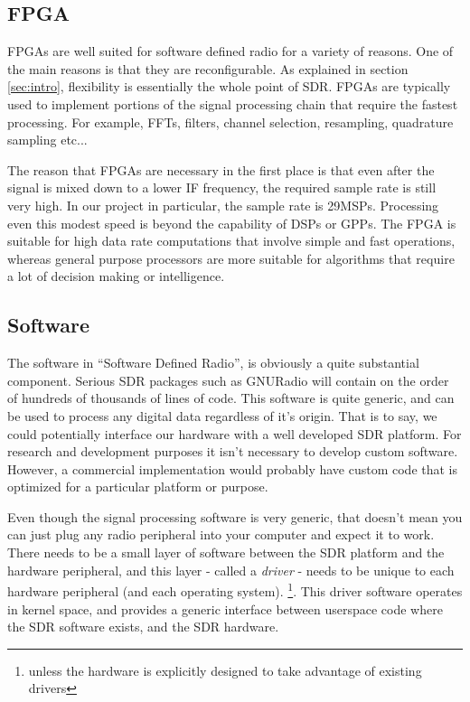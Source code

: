 \documentclass[a4paper, 12pt, notitlepage]{article}
\begin{document}
%
%

\subsection{FPGA}
\label{sec:fpga}
FPGAs are well suited for software defined radio for a variety of reasons.  One of the main reasons is that they are reconfigurable.  As explained in section \ref{sec:intro}, flexibility is essentially the whole point of SDR.  FPGAs are typically used to implement portions of the signal processing chain that require the fastest processing.  For example, FFTs, filters, channel selection, resampling, quadrature sampling etc...

The reason that FPGAs are necessary in the first place is that even after the signal is mixed down to a lower IF frequency, the required sample rate is still very high.  In our project in particular, the sample rate is 29MSPs.  Processing even this modest speed is beyond the capability of DSPs or GPPs.  The FPGA is suitable for high data rate computations that involve simple and fast operations, whereas general purpose processors are more suitable for algorithms that require a lot of decision making or intelligence.

\subsection{Software}
\label{sec:software}
The software in ``Software Defined Radio'', is obviously a quite substantial component.  Serious SDR packages such as GNURadio will contain on the order of hundreds of thousands of lines of code.  This software is quite generic, and can be used to process any digital data regardless of it's origin.  That is to say, we could potentially interface our hardware with a well developed SDR platform.  For research and development purposes it isn't necessary to develop custom software.  However, a commercial implementation would probably have custom code that is optimized for a particular platform or purpose.

Even though the signal processing software is very generic, that doesn't mean you can just plug any radio peripheral into your computer and expect it to work.  There needs to be a small layer of software between the SDR platform and the hardware peripheral, and this layer - called a \textit{driver} - needs to be unique to each hardware peripheral (and each operating system). \footnote{unless the hardware is explicitly designed to take advantage of existing drivers}.  This driver software operates in kernel space, and provides a generic interface between userspace code where the SDR software exists, and the SDR hardware.
\end{document}
